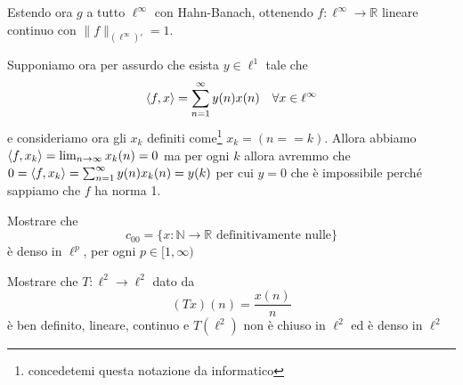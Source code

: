     Estendo ora \(g\) a tutto \(\ell^{\infty}\) con Hahn-Banach, ottenendo \(f :
    \ell^{\infty} \to \mathbb{R}\) lineare continuo con \(\|f\|_{(\ell^{\infty})'} = 1 \).

    Supponiamo ora per assurdo che esista \(y \in \ell^{1}\) tale che
    \[
      {\left\langle f, x\right\rangle} = \sum_{n=1}^{\infty} y{(n)}x{(n)} \quad \forall x \in \ell^{\infty} 
    \]
    e consideriamo ora gli \(x_k\) definiti come\footnote{concedetemi questa notazione da informatico} \(x_k = {(n == k)}\). Allora abbiamo \({\left\langle f, x_k\right\rangle} = \lim_{n \to \infty} x_k{(n)} = 0\) ma per ogni \(k\) allora avremmo che \\ \(0 = {\left\langle f, x_k\right\rangle} = \sum_{n=1}^{\infty} y{(n)}x_k{(n)} = y{(k)} \) per cui \(y = 0\) che è impossibile perché sappiamo che \(f\) ha norma 1.



\begin{eser}{}
    Mostrare che
    \[
        c_{00} = \{x : \mathbb{N}\to \mathbb{R} \text{ definitivamente nulle}\} 
    \]
    è denso in \(\ell^{p}\), per ogni \(p \in [1, \infty)\) 
\end{eser}

\begin{eser}{}
Mostrare che \(T : \ell^2 \to \ell^2\) dato da 
\[
  {(Tx)}{(n)} = \frac{x{(n)}}{n}
\]
è ben definito, lineare, continuo e \(T{(\ell^2)}\) non è chiuso in \(\ell^2\)
ed è denso in \(\ell^2\) 
    
\end{eser}



